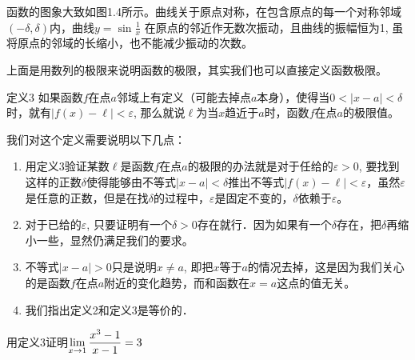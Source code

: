 函数的图象大致如图1.4所示。曲线关于原点对称，在包含原点的每一个对称邻域$(-\delta, \delta)$内，曲线$y=\sin\frac{1}{x}$
在原点的邻近作无数次振动，且曲线的振幅恒为1, 虽将原点的邻域的长缩小，也不能减少振动的次数。

\begin{figure}[htp]
    \centering
{}    
    \caption{}
\end{figure}

上面是用数列的极限来说明函数的极限，其实我们也可以直接定义函数极限。

\begin{blk}{定义3}
  如果函数$f$在点$a$邻域上有定义（可能去掉点$a$本身），使得当$0<|x-a|<\delta$时，就有$|f(x)-\ell|<\varepsilon$, 那么就说$\ell$为当$x$趋近于$a$时，函数$f$在点$a$的极限值。
\end{blk}

我们对这个定义需要说明以下几点：
\begin{enumerate}
    \item 用定义3验证某数$\ell$是函数$f$在点$a$的极限的办法就是对于任给的$\varepsilon>0$, 要找到这样的正数$\delta$使得能够由不等式$|x-a|<\delta$推出不等式$|f(x)-\ell|<\varepsilon$，虽然$\varepsilon$是任意的正数，但是在找$\delta$的过程中，$\varepsilon$是固定不变的，$\delta$依赖于$\varepsilon$。
    \item 对于已给的$\varepsilon$, 只要证明有一个$\delta>0$存在就行．因为如果有一个$\delta$存在，把$\delta$再缩小一些，显然仍满足我们的要求。
    \item 不等式$|x-a|>0$只是说明$x\ne a$, 即把$x$等于$a$的情况去掉，这是因为我们关心的是函数$f$在点$a$附近的变化趋势，而和函数在$x=a$这点的值无关。
    \item 我们指出定义2和定义3是等价的．
\end{enumerate}

\begin{example}
用定义3证明$\displaystyle\lim_{x\to 1}\dfrac{x^3-1}{x-1}=3$
\end{example}

